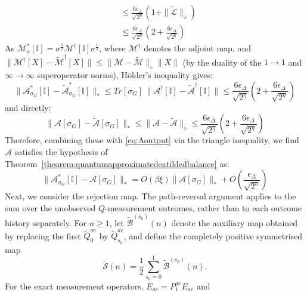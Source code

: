 \documentclass[aps,floatfix,10pt,amssymb,amsfont,amsmath,superscriptaddress,float,nofootinbib,longbibliography,nobalancelastpage,twocolumn]{revtex4-2}
\begin{document}
\begin{widetext}
\begin{align}
    &\leq \frac{6\epsilon_{\Delta}}{\sqrt{2^{\eta}}}(1+\|\tilde{\mathcal{L}}\|_{\diamond})\\
    &\leq \frac{6\epsilon_{\Delta}}{\sqrt{2^{\eta}}}(2+\frac{6\epsilon_{\Delta}}{\sqrt{2^{\eta}}})
\end{align}
As $\mathcal{M}^*_{\sigma}[\mathbb{I}] = \sigma^{\frac{1}{2}}\mathcal{M}^{\dagger}[\mathbb{I}]\sigma^{\frac{1}{2}}$, where $\mathcal{M}^{\dagger}$ denotes the adjoint map, and $\|\mathcal{M}^{\dagger}[X] - \tilde{\mathcal{M}}^{\dagger}[X]\| \leq \|\mathcal{M}-\tilde{\mathcal{M}}\|_{\diamond}\|X\|$ (by the duality of the $1\to1$ and $\infty\to\infty$ superoperator norms), H\"older's inequality gives:
\begin{equation}
    \|\mathcal{A}^*_{\sigma_G}[\mathbb{I}] - \tilde{\mathcal{A}}^*_{\sigma_G}[\mathbb{I}]\|_* \leq Tr[\sigma_G]\,\|\mathcal{A}^{\dagger}[\mathbb{I}] - \tilde{\mathcal{A}}^{\dagger}[\mathbb{I}]\| \leq \frac{6\epsilon_{\Delta}}{\sqrt{2^{\eta}}}(2+\frac{6\epsilon_{\Delta}}{\sqrt{2^{\eta}}})
\end{equation}
and directly:
\begin{equation}
    \|\mathcal{A}[\sigma_G] - \tilde{\mathcal{A}}[\sigma_G]\|_* \leq \|\mathcal{A}-\tilde{\mathcal{A}}\|_{\diamond} \leq \frac{6\epsilon_{\Delta}}{\sqrt{2^{\eta}}}(2+\frac{6\epsilon_{\Delta}}{\sqrt{2^{\eta}}})
\end{equation}
Therefore, combining these with \eqref{eq:Aoutput} via the triangle inequality, we find $\mathcal{A}$ satisfies the hypothesis of Theorem~\ref{theorem:quantumapproximatedeatildedbalance} as:
\begin{equation}
    \|\mathcal{A}^*_{\sigma_G}[\mathbb{I}] - \mathcal{A}[\sigma_G]\|_* = O(\beta\xi)\|\mathcal{A}[\sigma_G]\|_* + O\left(\frac{\epsilon_{\Delta}}{\sqrt{2^{\eta}}}\right)
\end{equation}
Next, we consider the rejection map.  The path-reversal argument applies to the
sum over the unobserved $Q$-measurement outcomes, rather than to each outcome
history separately.  For $n\geq 1$, let $\tilde{\mathcal{B}}^{(s_0)}(n)$ denote
the auxiliary map obtained by replacing the first $\tilde Q^{ae}_0$ by
$\tilde Q^{ae}_{s_0}$, and define the completely positive symmetrised map
\begin{equation*}
    \tilde{\mathcal{S}}(n)=\frac{1}{2}\sum_{s_0=0}^1
    \tilde{\mathcal{B}}^{(s_0)}(n).
\end{equation*}
For the exact measurement operators, $E_{ae}=P^{ae}_1E_{ae}$ and
\begin{equation*}

\end{equation*}
\end{widetext}
\end{document}
